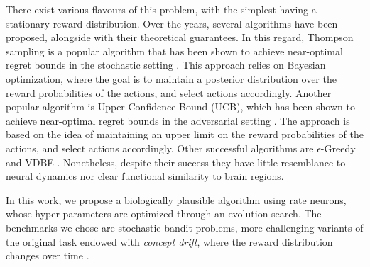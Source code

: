 There exist various flavours of this problem, with the simplest having a stationary reward distribution.
Over the years, several algorithms have been proposed, alongside with their theoretical guarantees.
In this regard, Thompson sampling is a popular algorithm that has been shown to achieve near-optimal regret bounds in the stochastic setting \cite{agrawalAnalysisThompsonSampling2012, kaufmannThompsonSamplingAsymptotically2012}.
This approach relies on Bayesian optimization, where the goal is to maintain a posterior distribution over the reward probabilities of the actions, and select actions accordingly.
Another popular algorithm is Upper Confidence Bound (UCB), which has been shown to achieve near-optimal regret bounds in the adversarial setting \cite{auerFinitetimeAnalysisMultiarmed2002}.
The approach is based on the idea of maintaining an upper limit on the reward probabilities of the actions, and select actions accordingly.
Other successful algorithms are $\epsilon$-Greedy and VDBE \cite{gittinsBanditProcessesDynamic1979, banMultifacetContextualBandits2021, tokicAdaptiveEGreedyExploration2010, tokicValueDifferenceBasedExploration2011}.
Nonetheless, despite their success they have little resemblance to neural dynamics nor clear functional similarity to brain regions.

\hfill \break
In this work, we propose a biologically plausible algorithm using rate neurons, whose hyper-parameters are optimized through an evolution search. The benchmarks we chose are stochastic bandit problems, more challenging variants of the original task endowed with \textit{concept drift}, where the reward distribution changes over time \cite{garivierUpperConfidenceBoundPolicies2008, besbesStochasticMultiArmedBanditProblem2014, cavenaghiNonStationaryMultiArmed2021}.

